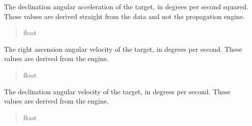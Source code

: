 \documentclass[letterpaper,11pt,english]{sphinxmanual}
\begin{document}
\begin{savenotes}
\begin{fulllineitems}
\begin{savenotes}\begin{fulllineitems}
\label{\detokenize{code/opihiexarata.propagate.solution:opihiexarata.propagate.solution.PropagativeSolution.raw_dec_acceleration}}
\pysigstartsignatures
{}
\pysigstopsignatures
\sphinxAtStartPar
The declination angular acceleration of the target, in degrees per
second squared. These values are derived straight from the data
and not the propagation engine.
\begin{quote}\begin{description}
\sphinxAtStartPar
float

\end{description}\end{quote}

\end{fulllineitems}\end{savenotes}


\begin{savenotes}\begin{fulllineitems}
\label{\detokenize{code/opihiexarata.propagate.solution:opihiexarata.propagate.solution.PropagativeSolution.ra_velocity}}
\pysigstartsignatures
{}
\pysigstopsignatures
\sphinxAtStartPar
The right ascension angular velocity of the target, in degrees per
second. These values are derived from the engine.
\begin{quote}\begin{description}
\sphinxAtStartPar
float

\end{description}\end{quote}

\end{fulllineitems}\end{savenotes}


\begin{savenotes}\begin{fulllineitems}
\label{\detokenize{code/opihiexarata.propagate.solution:opihiexarata.propagate.solution.PropagativeSolution.dec_velocity}}
\pysigstartsignatures
{}
\pysigstopsignatures
\sphinxAtStartPar
The declination angular velocity of the target, in degrees per
second. These values are derived from the engine.
\begin{quote}\begin{description}
\sphinxAtStartPar
float


\end{description}
\end{quote}
\end{fulllineitems}
\end{savenotes}
\end{fulllineitems}
\end{savenotes}
\end{document}
